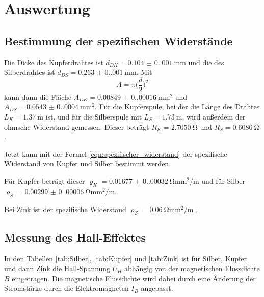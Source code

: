 \section{Auswertung}
\label{sec:Auswertung}

\subsection{Bestimmung der spezifischen Widerstände}
Die Dicke des Kupferdrahtes ist $d_{DK}=\qty{0.104(0.001)}{\milli\meter}$ und die des Silberdrahtes ist $d_{DS}=\qty{0.263(0.001)}{\milli\meter}$.
Mit 
\begin{equation}
  A=\pi \bigl(\frac{d}{2} \bigr)^2
\label{eqn:Querschnitt}
\end{equation}
\noindent 
kann dann die Fläche $A_{DK}=\qty{0.00849(0.00016)}{\milli\meter\squared}$ und $A_{DS}=\qty{0.0543(0.0004)}{\milli\meter\squared}$.
\noindent Für die Kupferspule, bei der die Länge des Drahtes $L_K=\qty{1.37}{\meter}$ ist, und für die Silberspule mit $L_S=\qty{1.73}{\meter}$, wird außerdem der ohmsche Widerstand gemessen.
Dieser beträgt $R_K=\qty{2.7050}{\ohm}$ und $R_S=\qty{0.6086}{\ohm}$.

\noindent Jetzt kann mit der Formel \ref{eqn:spezifischer_widerstand} der spezifische Widerstand von Kupfer und Silber bestimmt werden.


\noindent Für Kupfer beträgt dieser $\varrho_K=\qty{0.01677(0.00032)}{\ohm\milli\meter\squared\per\m}$ und für Silber $\varrho_S=\qty{0.00299(0.00006)}{\ohm\milli\meter\squared\per\m}$.

\noindent Bei Zink ist der spezifische Widerstand $\varrho_Z = \qty{0.06}{\ohm\milli\meter\squared\per\m}$ \cite{Zink}.


\subsection{Messung des Hall-Effektes}

In den Tabellen \ref{tab:Silber}, \ref{tab:Kupfer} und \ref{tab:Zink} ist für Silber, Kupfer und dann Zink die Hall-Spannung $U_H$ abhängig von der magnetischen Flussdichte $B$ eingetragen.
Die magnetische Flussdichte wird dabei durch eine Änderung der Stromstärke durch die Elektromagneten $I_B$ angepasst.
 

